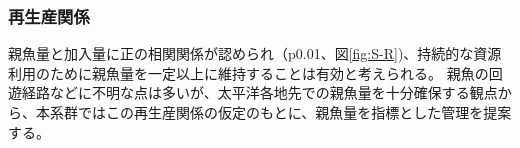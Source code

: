 \subsubsection{再生産関係}
親魚量と加入量に正の相関関係が認められ（p0.01、図\ref{fig:S-R})、持続的な資源利用のために親魚量を一定以上に維持することは有効と考えられる。
親魚の回遊経路などに不明な点は多いが、太平洋各地先での親魚量を十分確保する観点から、本系群ではこの再生産関係の仮定のもとに、親魚量を指標とした管理を提案する。


